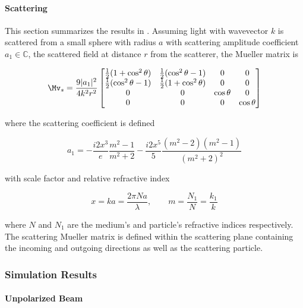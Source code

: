 \paragraph{Scattering}
This section summarizes the results in \cite{bohren2008absorption}. Assuming light with wavevector $k$ is scattered from a small sphere with radius $a$ with scattering amplitude coefficient $a_1 \in \mathbb{C}$, the scattered field at distance $r$ from the scatterer, the Mueller matrix is

\begin{equation}
    \Mv_s = \frac{9|a_1|^2}{4k^2r^2}
    \begin{bmatrix}
        \tfrac{1}{2}(1 + \cos^2{\theta}) & \tfrac{1}{2}(\cos^2{\theta} - 1) & 0 & 0 \\
        \tfrac{1}{2}(\cos^2{\theta} - 1) & \tfrac{1}{2}(1 + \cos^2{\theta}) & 0 & 0 \\
        0 & 0 & \cos{\theta} & 0 \\ 
        0 & 0 & 0 & \cos{\theta}
    \end{bmatrix}
\end{equation}

where the scattering coefficient is defined

\begin{equation}
    a_1 = -\frac{i2x^3}{e} \frac{m^2 - 1}{m^2 + 2} - \frac{i2x^5}{5} \frac{(m^2 - 2)(m^2 - 1)}{(m^2 + 2)^2}
\end{equation}

with scale factor and relative refractive index

\begin{equation}
    x = ka = \frac{2 \pi N a}{\lambda},  \qquad m = \frac{N_1}{N} = \frac{k_1}{k}
\end{equation}

where $N$ and $N_1$ are the medium's and particle's refractive indices respectively. The scattering Mueller matrix is defined within the scattering plane containing the incoming and outgoing directions as well as the scattering particle.

\subsubsection{Simulation Results}
 
\paragraph{Unpolarized Beam}

